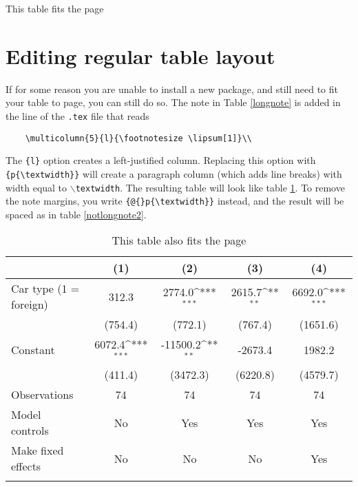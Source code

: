 \documentclass[11pt,a4paper]{article}
\def\sym#1{\ifmmode^{#1}\else\(^{#1}\)\fi}
\begin{document}
\begin{table}[h]
	\begin{threeparttable}
	\caption{This table fits the page}
	\label{threeparttable}
		
	\end{threeparttable}
\end{table}

\section{Editing regular table layout}

If for some reason you are unable to install a new package, and still need to fit your table to page, you can still do so. The note in Table \ref{longnote} is added in the line of the \texttt{.tex} file that reads 

\begin{verbatim}
	\multicolumn{5}{l}{\footnotesize \lipsum[1]}\\
\end{verbatim}

The \texttt{\{l\}} option creates a left-justified column. Replacing this option with \texttt{\{p\{\textbackslash textwidth\}\}} will create a paragraph column (which adds line breaks) with width equal to \texttt{$\backslash$textwidth}. The resulting table will look like table \ref{notlongnote}. To remove the note margins, you write \texttt{\{@\{\}p\{\textbackslash textwidth\}\}} instead, and the result will be spaced as in table \ref{notlongnote2}.


\begin{table}[H]
	\caption{This table also fits the page}
	\label{notlongnote}
{
	\def\sym#1{\ifmmode^{#1}\else\(^{#1}\)\fi}
	\begin{tabular}{l*{4}{c}}
		\hline\hline
		&\multicolumn{1}{c}{(1)}         &\multicolumn{1}{c}{(2)}         &\multicolumn{1}{c}{(3)}         &\multicolumn{1}{c}{(4)}         \\
		\hline
		Car type (1 = foreign)     &    312.3         &   2774.0\sym{***}&   2615.7\sym{**} &   6692.0\sym{***}\\
		&  (754.4)         &  (772.1)         &  (767.4)         & (1651.6)         \\
		[1em]
		Constant        &   6072.4\sym{***}& -11500.2\sym{**} &  -2673.4         &   1982.2         \\
		&  (411.4)         & (3472.3)         & (6220.8)         & (4579.7)         \\
		\hline
		Observations    &       74         &       74         &       74         &       74         \\
		Model controls  &       No         &      Yes         &      Yes         &      Yes         \\
		Make fixed effects&       No         &       No         &       No         &      Yes         \\
		\hline\hline \multicolumn{5}{p{\textwidth}}{\footnotesize \lipsum[1] }\\ \end{tabular}}
\end{table}
\end{document}
